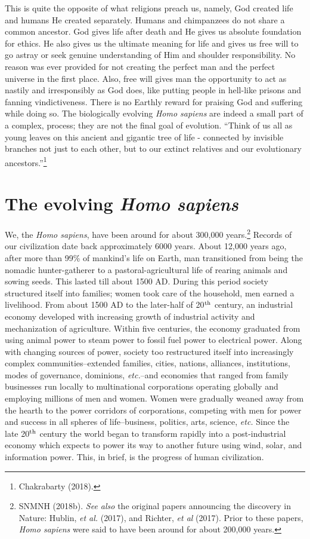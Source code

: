 \begin{multicols}{2}
This is quite the opposite of what religions preach us, namely, God created life and humans He created
separately. Humans and chimpanzees do not share a common ancestor. God gives life after death and
He gives us absolute foundation for ethics. He also gives us the ultimate meaning for life and gives us
free will to go astray or seek genuine understanding of Him and shoulder responsibility. No reason
was ever provided for not creating the perfect man and the perfect universe in the first place. Also,
free will gives man the opportunity to act as nastily and irresponsibly as God does, like putting people
in hell-like prisons and fanning vindictiveness. There is no Earthly reward for praising God and suffering
while doing so. The biologically evolving \textit{Homo sapiens} are indeed a small part of a complex, process;
they are not the final goal of evolution. “Think of us all as young leaves on this ancient and gigantic
tree of life - connected by invisible branches not just to each other, but to our extinct relatives and
our evolutionary ancestors.”\footnote{Chakrabarty (2018).}

\section{The evolving \textit{Homo sapiens}}

We, the \textit{Homo sapiens}, have been around for about 300,000 years.\footnote{SNMNH (2018b). \textit{See also} the original papers announcing the discovery in Nature: Hublin, \textit{et al.} (2017), and Richter, \textit{et al} (2017). Prior to these papers, \textit{Homo sapiens} were said to have been around for about 200,000 years.} Records of our civilization date back approximately 6000 years. About 12,000 years ago, after more than 99\% of mankind's life on Earth, man transitioned from being the nomadic hunter-gatherer to a pastoral-agricultural life of rearing animals and sowing seeds. This lasted till about 1500 AD. During this period society structured itself into families; women took care of the household, men earned a livelihood. From about 1500 AD to the later-half of 20$^{\rm th}$ century, an industrial economy developed with increasing growth of industrial activity and mechanization of agriculture. Within five centuries, the economy graduated from using animal power to steam power to fossil fuel power to electrical power. Along with changing sources of power, society too restructured itself into increasingly complex communities--extended families, cities, nations, alliances, institutions, modes of governance, dominions, \textit{etc.}--and economies that ranged from family businesses run locally to multinational corporations operating globally and employing millions of men and women. Women were gradually weaned away from the hearth to the power corridors of corporations, competing with men for power and success in all spheres of life--business, politics, arts, science, \textit{etc.} Since the late 20$^{\rm th}$ century the world began to transform rapidly into a post-industrial economy which expects to power its way to another future using wind, solar, and information power. This, in brief, is the progress of human civilization.


\end{multicols}
